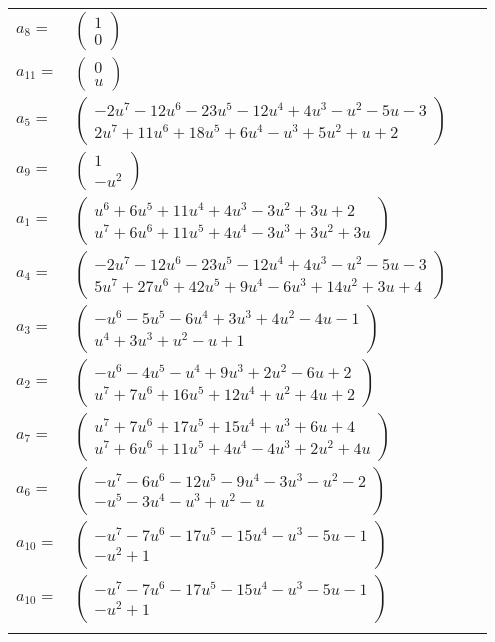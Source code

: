 \documentclass[1p]{elsarticle_modified}
\theoremstyle{definition}
\begin{document}
\begin{tabular}{m{7pt} m{180pt} m{7pt} m{180pt} }
\flushright $a_{8}=$&$\begin{pmatrix}1\\0\end{pmatrix}$ \\
\flushright $a_{11}=$&$\begin{pmatrix}0\\u\end{pmatrix}$ \\
\flushright $a_{5}=$&$\begin{pmatrix}-2 u^7-12 u^6-23 u^5-12 u^4+4 u^3- u^2-5 u-3\\2 u^7+11 u^6+18 u^5+6 u^4- u^3+5 u^2+u+2\end{pmatrix}$ \\
\flushright $a_{9}=$&$\begin{pmatrix}1\\- u^2\end{pmatrix}$ \\
\flushright $a_{1}=$&$\begin{pmatrix}u^6+6 u^5+11 u^4+4 u^3-3 u^2+3 u+2\\u^7+6 u^6+11 u^5+4 u^4-3 u^3+3 u^2+3 u\end{pmatrix}$ \\
\flushright $a_{4}=$&$\begin{pmatrix}-2 u^7-12 u^6-23 u^5-12 u^4+4 u^3- u^2-5 u-3\\5 u^7+27 u^6+42 u^5+9 u^4-6 u^3+14 u^2+3 u+4\end{pmatrix}$ \\
\flushright $a_{3}=$&$\begin{pmatrix}- u^6-5 u^5-6 u^4+3 u^3+4 u^2-4 u-1\\u^4+3 u^3+u^2- u+1\end{pmatrix}$ \\
\flushright $a_{2}=$&$\begin{pmatrix}- u^6-4 u^5- u^4+9 u^3+2 u^2-6 u+2\\u^7+7 u^6+16 u^5+12 u^4+u^2+4 u+2\end{pmatrix}$ \\
\flushright $a_{7}=$&$\begin{pmatrix}u^7+7 u^6+17 u^5+15 u^4+u^3+6 u+4\\u^7+6 u^6+11 u^5+4 u^4-4 u^3+2 u^2+4 u\end{pmatrix}$ \\
\flushright $a_{6}=$&$\begin{pmatrix}- u^7-6 u^6-12 u^5-9 u^4-3 u^3- u^2-2\\- u^5-3 u^4- u^3+u^2- u\end{pmatrix}$ \\
\flushright $a_{10}=$&$\begin{pmatrix}- u^7-7 u^6-17 u^5-15 u^4- u^3-5 u-1\\- u^2+1\end{pmatrix}$\\ \flushright $a_{10}=$&$\begin{pmatrix}- u^7-7 u^6-17 u^5-15 u^4- u^3-5 u-1\\- u^2+1\end{pmatrix}$\\&\end{tabular}
\end{document}
